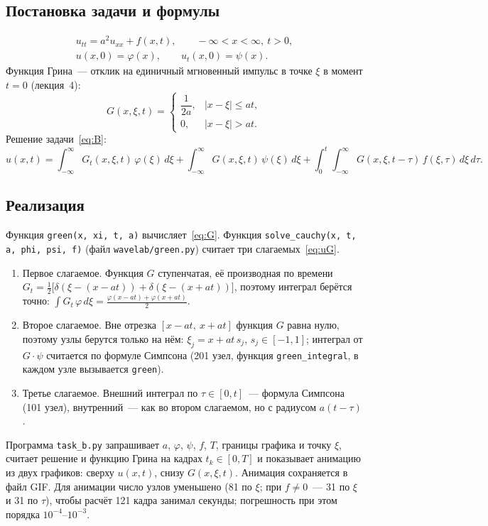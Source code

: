 \documentclass[a4paper,12pt]{article}
\newcommand{\code}[1]{\texttt{#1}}
\begin{document}
\subsection{Постановка задачи и формулы}

\begin{equation}\label{eq:B}
\begin{gathered}
  u_{tt}=a^{2}u_{xx}+f(x,t),\qquad -\infty<x<\infty,\ t>0,\\
  u(x,0)=\varphi(x),\qquad u_t(x,0)=\psi(x).
\end{gathered}
\end{equation}
Функция Грина~--- отклик на единичный мгновенный импульс в точке $\xi$
в момент $t=0$ (лекция~4):
\begin{equation}\label{eq:G}
  G(x,\xi,t)=
  \begin{cases}
    \dfrac{1}{2a}, & |x-\xi|\le at,\\[6pt]
    0, & |x-\xi|>at.
  \end{cases}
\end{equation}
Решение задачи~\eqref{eq:B}:
\begin{equation}\label{eq:uG}
  u(x,t)=\int_{-\infty}^{\infty}\!G_t(x,\xi,t)\,\varphi(\xi)\,d\xi
        +\int_{-\infty}^{\infty}\!G(x,\xi,t)\,\psi(\xi)\,d\xi
        +\int_{0}^{t}\!\!\int_{-\infty}^{\infty}\!G(x,\xi,t-\tau)\,f(\xi,\tau)\,d\xi\,d\tau .
\end{equation}

\subsection{Реализация}

Функция \code{green(x, xi, t, a)} вычисляет~\eqref{eq:G}. Функция
\code{solve\_cauchy(x, t, a, phi, psi, f)} (файл \code{wavelab/green.py})
считает три слагаемых~\eqref{eq:uG}.
\begin{enumerate}
  \item Первое слагаемое. Функция $G$ ступенчатая, её производная по времени
        $G_t=\tfrac12\bigl[\delta(\xi-(x-at))+\delta(\xi-(x+at))\bigr]$, поэтому
        интеграл берётся точно:
        $\displaystyle\int G_t\,\varphi\,d\xi=\frac{\varphi(x-at)+\varphi(x+at)}{2}$.
  \item Второе слагаемое. Вне отрезка $[x-at,\ x+at]$ функция $G$ равна нулю,
        поэтому узлы берутся только на нём: $\xi_j=x+at\,s_j$, $s_j\in[-1,1]$;
        интеграл от $G\cdot\psi$ считается по формуле Симпсона (201 узел,
        функция \code{green\_integral}, в каждом узле вызывается \code{green}).
  \item Третье слагаемое. Внешний интеграл по $\tau\in[0,t]$~--- формула
        Симпсона (101 узел), внутренний~--- как во втором слагаемом,
        но с радиусом $a(t-\tau)$.
\end{enumerate}
Программа \code{task\_b.py} запрашивает $a$, $\varphi$, $\psi$, $f$, $T$, границы
графика и точку $\xi$, считает решение и функцию Грина на кадрах
$t_k\in[0,T]$ и показывает анимацию из двух графиков: сверху $u(x,t)$, снизу
$G(x,\xi,t)$. Анимация сохраняется в файл GIF. Для анимации число узлов
уменьшено (81 по $\xi$; при $f\ne 0$~--- 31 по $\xi$ и 31 по $\tau$), чтобы расчёт
121 кадра занимал секунды; погрешность при этом порядка $10^{-4}$--$10^{-3}$.
\end{document}
